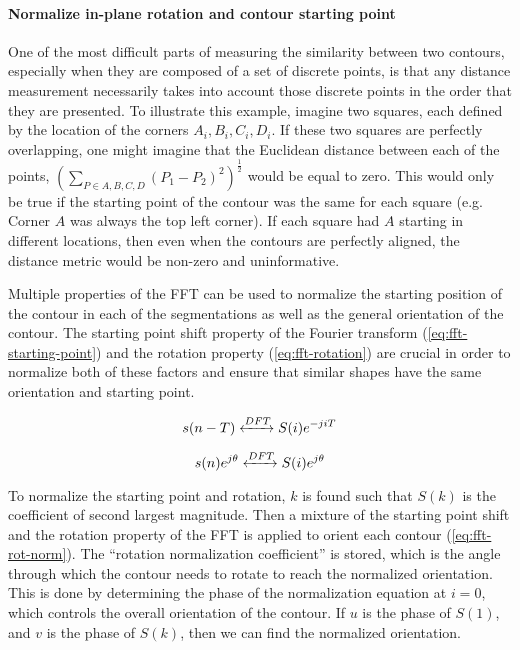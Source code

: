 \paragraph*{Normalize in-plane rotation and contour starting point}

One of the most difficult parts of measuring the similarity between two contours, especially when they are composed of a set of discrete points, is that any distance measurement necessarily takes into account those discrete points in the order that they are presented.
To illustrate this example, imagine two squares, each defined by the location of the corners $A_i,B_i,C_i,D_i$.
If these two squares are perfectly overlapping, one might imagine that the Euclidean distance between each of the points, $(\sum_{P \in A,B,C,D} (P_1 - P_2)^2)^{\frac{1}{2}}$ would be equal to zero.
This would only be true if the starting point of the contour was the same for each square (e.g. Corner $A$ was always the top left corner).
If each square had $A$ starting in different locations, then even when the contours are perfectly aligned, the distance metric would be non-zero and uninformative.

Multiple properties of the FFT can be used to normalize the starting position of the contour in each of the segmentations as well as the general orientation of the contour.
The starting point shift property of the Fourier transform (\cref{eq:fft-starting-point}) and the rotation property (\cref{eq:fft-rotation}) are crucial in order to normalize both of these factors and ensure that similar shapes have the same orientation and starting point.

\begin{equation}
    s(n-T) \xleftrightarrow[]{DFT} S(i)e^{-jiT}
    \label{eq:fft-starting-point}
\end{equation}

\begin{equation}
    s(n)e^{j\theta} \xleftrightarrow[]{DFT} S(i)e^{j\theta}
    \label{eq:fft-rotation}
\end{equation}

To normalize the starting point and rotation, $k$ is found such that $S(k)$ is the coefficient of second largest magnitude.
Then a mixture of the starting point shift and the rotation property of the FFT is applied to orient each contour (\cref{eq:fft-rot-norm}).
The ``rotation normalization coefficient'' is stored, which is the angle through which the contour needs to rotate to reach the normalized orientation.
This is done by determining the phase of the normalization equation at $i = 0$, which controls the overall orientation of the contour.
If $u$ is the phase of $S(1)$, and $v$ is the phase of $S(k)$, then we can find the normalized orientation.

